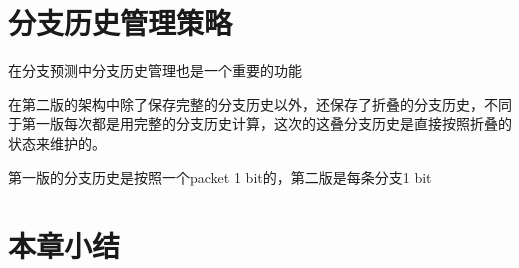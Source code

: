 



\section{分支历史管理策略}

在分支预测中分支历史管理也是一个重要的功能

在第二版的架构中除了保存完整的分支历史以外，还保存了折叠的分支历史，不同于第一版每次都是用完整的分支历史计算，这次的这叠分支历史是直接按照折叠的状态来维护的。

第一版的分支历史是按照一个packet 1 bit的，第二版是每条分支1 bit

\section{本章小结}

